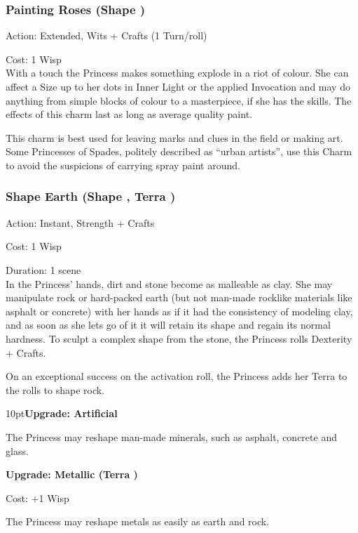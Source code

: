 \subsubsection*{Painting Roses (Shape \textbullet)}

\noindent Action: Extended, Wits + Crafts (1 Turn/roll)

\noindent Cost: 1 Wisp \\

\noindent With a touch the Princess makes something explode in a riot of colour. She can affect a Size up to her dots in Inner Light or the applied Invocation and may do anything from simple blocks of colour to a masterpiece, if she has the skills. The effects of this charm last as long as average quality paint.

This charm is best used for leaving marks and clues in the field or making art. Some Princesses of Spades, politely described as \textquotedblleft urban artists\textquotedblright , use this Charm to avoid the suspicions of carrying spray paint around.

\subsubsection*{Shape Earth (Shape \textbullet, Terra \textbullet)}

\noindent Action: Instant, Strength + Crafts

\noindent Cost: 1 Wisp

\noindent Duration: 1 scene \\

\noindent In the Princess' hands, dirt and stone become as malleable as clay. She may manipulate rock or hard-packed earth (but not man-made rocklike materials like asphalt or concrete) with her hands as if it had the consistency of modeling clay, and as soon as she lets go of it it will retain its shape and regain its normal hardness. To sculpt a complex shape from the stone, the Princess rolls Dexterity + Crafts.

On an exceptional success on the activation roll, the Princess adds her Terra to the rolls to shape rock.
\begin{myindentpar}{10pt}\textbf{Upgrade: Artificial}

The Princess may reshape man-made minerals, such as asphalt, concrete and glass.

\textbf{Upgrade: Metallic (Terra \textbullet\textbullet)}

\noindent Cost: +1 Wisp

The Princess may reshape metals as easily as earth and rock.\end{myindentpar}


